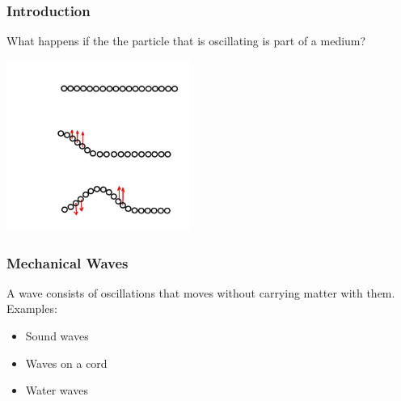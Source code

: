 \documentclass[]{beamer}
\begin{document}
\begin{frame}
\frametitle{Introduction}

What happens if the the particle that is oscillating is part of a medium? 

\begin{center}
  \includegraphics[height=2.2in]{images4/0.jpg}
\end{center}

  \end{frame}



\begin{frame}
\frametitle{Mechanical Waves}

A wave consists of oscillations that moves without carrying matter with them. Examples:
\vspace{3mm}

\pause

\begin{itemize}
\item Sound waves
\pause
\item Waves on a cord
\pause
\item Water waves
\end{itemize}




  \end{frame}

\end{document}
